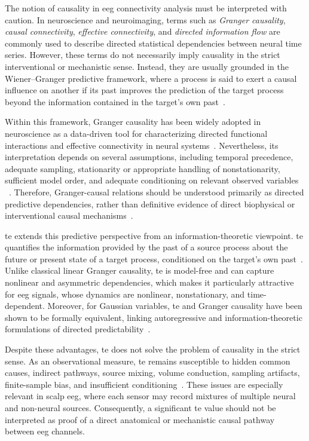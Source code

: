 The notion of causality in \gls{eeg} connectivity analysis must be interpreted with caution. In neuroscience and neuroimaging, terms such as \emph{Granger causality}, \emph{causal connectivity}, \emph{effective connectivity}, and \emph{directed information flow} are commonly used to describe directed statistical dependencies between neural time series. However, these terms do not necessarily imply causality in the strict interventional or 
mechanistic sense. Instead, they are usually grounded in the Wiener--Granger predictive framework, where a process is said to exert a causal influence on another if its past improves the prediction of the target process beyond the information contained in the target's own past~\cite{Granger1969,Seth2015Granger}.

Within this framework, Granger causality has been widely adopted in neuroscience as a data-driven tool for characterizing directed functional interactions and effective connectivity in neural systems~\cite{Friston2013Connectivity,Seth2015Granger}. Nevertheless, its interpretation depends on several assumptions, including temporal precedence, adequate sampling, stationarity or appropriate handling of nonstationarity, sufficient model order, and adequate conditioning on relevant observed variables
~\cite{Seth2015Granger,Barnett2017Subsampling,Stokes2017Problems}. Therefore, Granger-causal relations should be understood primarily as directed predictive dependencies, rather than definitive evidence of direct biophysical or interventional causal mechanisms~\cite{Seth2015Granger,Stokes2017Problems}.

\gls{te} extends this predictive perspective from an information-theoretic viewpoint. \gls{te} quantifies the information provided by the past of a source process about the future or present state of a target process, conditioned on the target's own past~\cite{Schreiber2000,Vicente2011TE}. Unlike classical linear Granger causality, \gls{te} is model-free and can capture nonlinear and asymmetric dependencies, which makes it particularly attractive for \gls{eeg} signals, whose dynamics are nonlinear, nonstationary, and time-dependent. Moreover, for Gaussian variables, \gls{te} and Granger causality have been shown to be formally equivalent, linking autoregressive and information-theoretic formulations of directed predictability~\cite{Barnett2009TEGC}.

Despite these advantages, \gls{te} does not solve the problem of causality in the strict sense. As an observational measure, \gls{te} remains susceptible to hidden common causes, indirect pathways, source mixing, volume conduction, sampling artifacts, finite-sample bias, and insufficient conditioning~\cite{Haufe2013EEGConnectivity,Bastos2016Pitfalls,TehraniSaleh2020TE}. These issues are especially relevant in scalp \gls{eeg}, where each sensor may record mixtures of multiple neural and non-neural sources. Consequently, a significant \gls{te} value should not be interpreted as proof of a direct anatomical or mechanistic causal pathway between \gls{eeg} channels.

